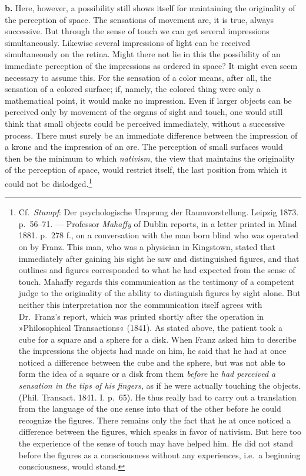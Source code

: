 \documentclass[12pt,a4paper]{book}
\newcommand{\opage}[1]{\marginnote{\footnotesize\textit{[#1]}}}
\begin{document}
\textbf{b.} Here, however, a possibility still shows itself for
maintaining the originality of the perception of space. The sensations
of movement are, it is true, always successive. But through the sense of
touch we can get several impressions simultaneously. Likewise several
impressions of light can be received simultaneously on the retina. Might
there not lie in this the possibility of an immediate perception of the
impressions as ordered in space? It might even seem necessary to assume
this. For the sensation of a color means, after all, the sensation of a
colored surface; if, namely, the colored thing were only a mathematical
point,
\opage{243}it would make no impression. Even if larger objects can be
perceived only by movement of the organs of sight and touch, one would
still think that small objects could be perceived immediately, without a
successive process. There must surely be an immediate difference between
the impression of a krone and the impression of an øre. The perception
of small surfaces would then be the minimum to which \emph{nativism}, the
view that maintains the originality of the perception of space, would
restrict itself, the last position from which it could not be
dislodged.\footnote{Cf.\ \emph{Stumpf}: Der psychologische Ursprung der
Raumvorstellung. Leipzig 1873. p.~56--71. --- Professor \emph{Mahaffy} of
Dublin reports, in a letter printed in Mind 1881. p.~278 f., on a
conversation with the man born blind who was operated on by Franz. This
man, who was a physician in Kingstown, stated that immediately after
gaining his sight he saw and distinguished figures, and that outlines and
figures corresponded to what he had expected from the sense of touch.
Mahaffy regards this communication as the testimony of a competent judge
to the originality of the ability to distinguish figures by sight alone.
But neither this interpretation nor the communication itself agrees with
Dr.\ Franz's report, which was printed shortly after the operation in
»Philosophical Transactions« (1841). As stated above, the patient took a
cube for a square and a sphere for a disk. When Franz asked him to
describe the impressions the objects had made on him, he said that he
had at once noticed a difference between the cube and the sphere, but
was not able to form the idea of a square or a disk from them
\emph{before} he \emph{had perceived a sensation in the tips of his
fingers}, as if he were actually touching the objects. (Phil. Transact.
1841. I. p.~65). He thus really had to carry out a translation from the
language of the one sense into that of the other before he could
recognize the figures. There remains only the fact that he at once
noticed a difference between the figures, which speaks in favor of
nativism. But here too the experience of the sense of touch may have
helped him. He did not stand before the figures as a consciousness
without any experiences, i.e.\ a beginning consciousness, would stand.}
\end{document}
